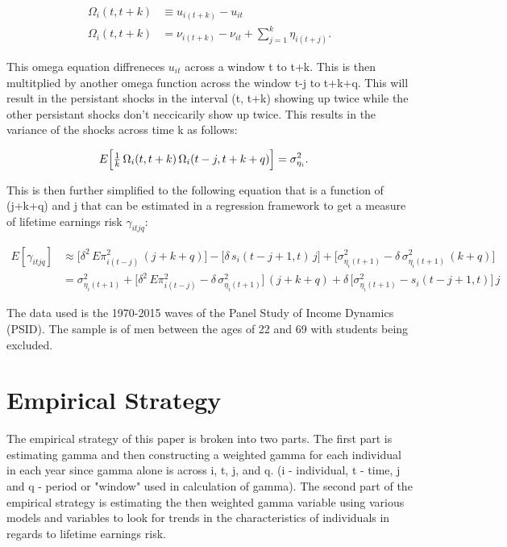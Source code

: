 \documentclass[12pt]{article}
\begin{document}
\begin{onehalfspace}
\begin{align}
\Omega_i(t,t+k)
&\equiv u_{i(t+k)} - u_{it}\\[1ex]
\Omega_i(t,t+k)
&= \nu_{i(t+k)} - \nu_{it}
  + \sum_{j=1}^k \eta_{i(t+j)}.
\end{align}



This omega equation diffreneces $u_{it}$ across a window t to t+k. This is then multitplied by another omega function across the window t-j to t+k+q. This will result in the persistant shocks in the interval (t, t+k) showing up twice while the other persistant shocks don't neccicarily show up twice. This results in the variance of the shocks across time k as follows:


\begin{align}
E\Bigl[\tfrac{1}{k}\,\Omega_i(t,t+k)\,\Omega_i(t-j,t+k+q)\Bigr]
&= \sigma^2_{\eta_i}.
\end{align}


This is then further simplified to the following equation that is a function of (j+k+q) and j that can be estimated in a regression framework to get a measure of lifetime earnings risk $\gamma_{itjq}$:



\begin{align}
E[\gamma_{itjq}]
&\approx
\bigl[\delta^2\,E\pi^2_{i(t-j)}\,(j+k+q)\bigr]
- \bigl[\delta\,s_i(t-j+1,t)\,j\bigr]
+ \bigl[\sigma^2_{\eta_i(t+1)}
  - \delta\,\sigma^2_{\eta_i(t+1)}\,(k+q)\bigr] \\
&=
\sigma^2_{\eta_i(t+1)}
+ \bigl[\delta^2\,E\pi^2_{i(t-j)} - \delta\,\sigma^2_{\eta_i(t+1)}\bigr]\,(j+k+q)
+ \delta\,\bigl[\sigma^2_{\eta_i(t+1)} - s_i(t-j+1,t)\bigr]\,j
\end{align}






The data used is the 1970-2015 waves of the Panel Study of Income Dynamics (PSID). The sample is of men between the ages of 22 and 69 with students being excluded.


\section{Empirical Strategy}

The empirical strategy of this paper is broken into two parts. The first part is estimating gamma and then constructing a weighted gamma for each individual in each year since gamma alone is across i, t, j, and q. (i - individual, t - time, j and q - period or "window" used in calculation of gamma). The second part of the empirical strategy is estimating the then weighted gamma variable using various models and variables to look for trends in the characteristics of individuals in regards to lifetime earnings risk.


\end{onehalfspace}
\end{document}
